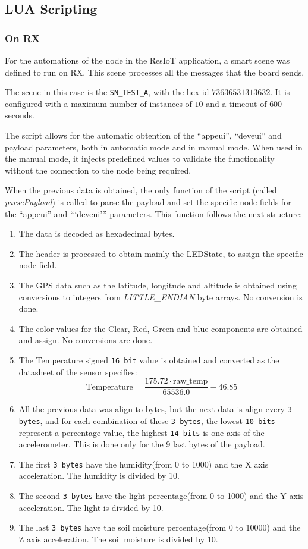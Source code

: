 \subsection{LUA Scripting}
\subsubsection*{On RX}
For the automations of the node in the ResIoT application, a smart scene was defined to run on RX. This scene processes all the messages that the board sends.

The scene in this case is the \texttt{SN\_TEST\_A}, with the hex id $73636531313632$. It is configured with a maximum number of instances of $10$ and a timeout of $600$ seconds.

The script allows for the automatic obtention of the ``appeui'', ``deveui'' and payload parameters, both in automatic mode and in manual mode. When used in the manual mode, it injects 
predefined values to validate the functionality without the connection to the node being required.

When the previous data is obtained, the only function of the script (called \textit{parsePayload}) is called to parse the payload and set the specific node fields for the ``appeui'' and ```deveui''' parameters. This function follows the next structure:
\begin{enumerate}
    \item The data is decoded as hexadecimal bytes.
    \item The header is processed to obtain mainly the LEDState, to assign the specific node field.
    \item The GPS data such as the latitude, longitude and altitude is obtained using conversions to integers from \textit{LITTLE\_ENDIAN} byte arrays. No conversion is done.
    \item The color values for the Clear, Red, Green and blue components are obtained and assign. No conversions are done.
    \item The Temperature signed \texttt{16 bit} value is obtained and converted as the datasheet of the sensor specifies\cite{Support_Documents_TechnicalDocs_Si7021A20}:
    \[
    \text{Temperature} = \frac{175.72 \cdot \text{raw\_temp}}{65536.0} - 46.85
    \]
    \item All the previous data was align to bytes, but the next data is align every \texttt{3 bytes}, and for each combination of these \texttt{3 bytes}, the lowest \texttt{10 bits} represent a percentage value, the highest \texttt{14 bits} is one axis of the accelerometer. This is done only for the 9 last bytes of the payload.
    \item The first \texttt{3 bytes} have the humidity(from 0 to 1000) and the X axis acceleration. The humidity is divided by 10.
    \item The second \texttt{3 bytes} have the light percentage(from 0 to 1000) and the Y axis acceleration. The light is divided by 10.
    \item The last \texttt{3 bytes} have the soil moisture percentage(from 0 to 10000) and the Z axis acceleration. The soil moisture is divided by 10.
\end{enumerate}

